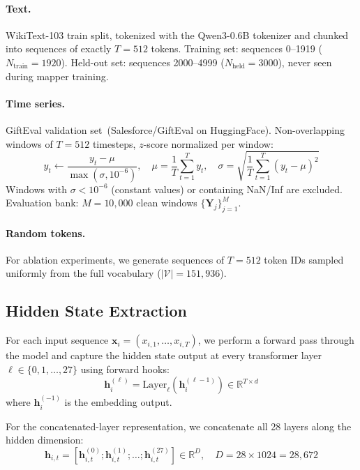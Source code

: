 \documentclass[11pt,a4paper]{article}
\newcommand{\R}{\mathbb{R}}
\newcommand{\bh}{\mathbf{h}}
\newcommand{\bY}{\mathbf{Y}}
\begin{document}
\paragraph{Text.}
WikiText-103 train split, tokenized with the Qwen3-0.6B tokenizer and chunked into sequences of exactly $T = 512$ tokens.
Training set: sequences 0--1919 ($N_{\text{train}} = 1920$).
Held-out set: sequences 2000--4999 ($N_{\text{held}} = 3000$), never seen during mapper training.

\paragraph{Time series.}
GiftEval validation set~(Salesforce/GiftEval on HuggingFace).
Non-overlapping windows of $T = 512$ timesteps, $z$-score normalized per window:
\begin{equation}
    y_t \leftarrow \frac{y_t - \mu}{\max(\sigma, 10^{-6})}, \quad
    \mu = \frac{1}{T}\sum_{t=1}^T y_t, \quad
    \sigma = \sqrt{\frac{1}{T}\sum_{t=1}^T (y_t - \mu)^2}
\end{equation}
Windows with $\sigma < 10^{-6}$ (constant values) or containing NaN/Inf are excluded.
Evaluation bank: $M = 10{,}000$ clean windows $\{\bY_j\}_{j=1}^M$.

\paragraph{Random tokens.}
For ablation experiments, we generate sequences of $T = 512$ token IDs sampled uniformly from the full vocabulary ($|\mathcal{V}| = 151{,}936$).

\subsection{Hidden State Extraction}

For each input sequence $\mathbf{x}_i = (x_{i,1}, \ldots, x_{i,T})$, we perform a forward pass through the model and capture the hidden state output at every transformer layer $\ell \in \{0, 1, \ldots, 27\}$ using forward hooks:
\begin{equation}
    \bh_i^{(\ell)} = \text{Layer}_\ell(\bh_i^{(\ell-1)}) \in \R^{T \times d}
\end{equation}
where $\bh_i^{(-1)}$ is the embedding output.

For the concatenated-layer representation, we concatenate all 28 layers along the hidden dimension:
\begin{equation}
    \bh_{i,t} = \left[\bh_{i,t}^{(0)}; \bh_{i,t}^{(1)}; \ldots; \bh_{i,t}^{(27)}\right] \in \R^D, \quad D = 28 \times 1024 = 28{,}672
\end{equation}
\end{document}
